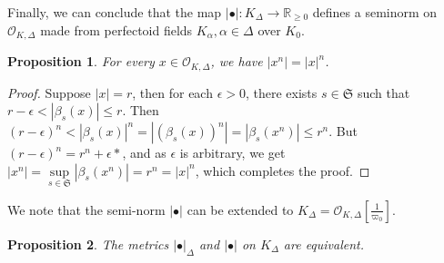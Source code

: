 \documentclass[12pts,a4paper]{amsart}
\newtheorem{proposition}{Proposition}[section]
\begin{document}
Finally, we can conclude that the map $|\bullet|:K_\Delta\to\mathbb{R}_{\geq 0}$ defines a seminorm on $\mathcal{O}_{K,\Delta}$ made from perfectoid fields $K_\alpha,\alpha\in\Delta$ over $K_0$.

\begin{proposition}
	For every $x\in\mathcal{O}_{K,\Delta}$, we have $|x^n|=|x|^n$.
\end{proposition}

\begin{proof}
   Suppose $|x|=r$, then for each $\epsilon>0$, there exists $s\in\mathfrak{S}$ such that $r-\epsilon< |\beta_s(x)|\leq r$. Then $(r-\epsilon)^n<|\beta_s(x)|^n=|(\beta_s(x))^n|=|\beta_s(x^n)|\leq r^n$. But $(r-\epsilon)^n=r^n+\epsilon *$, and as $\epsilon$ is arbitrary, we get $|x^n|=\sup\limits_{s\in\mathfrak{S}}|\beta_s(x^n)|=r^n=|x|^n$, which completes the proof.
\end{proof}
We note that the semi-norm $|\bullet|$ can be extended to $K_\Delta = \mathcal{O}_{K,\Delta}\left[\frac{1}{\varpi_0}\right]$.

\begin{proposition}
    The metrics $|\bullet|_\Delta$ and $|\bullet|$ on $K_\Delta$ are equivalent.
\end{proposition}
\end{document}
